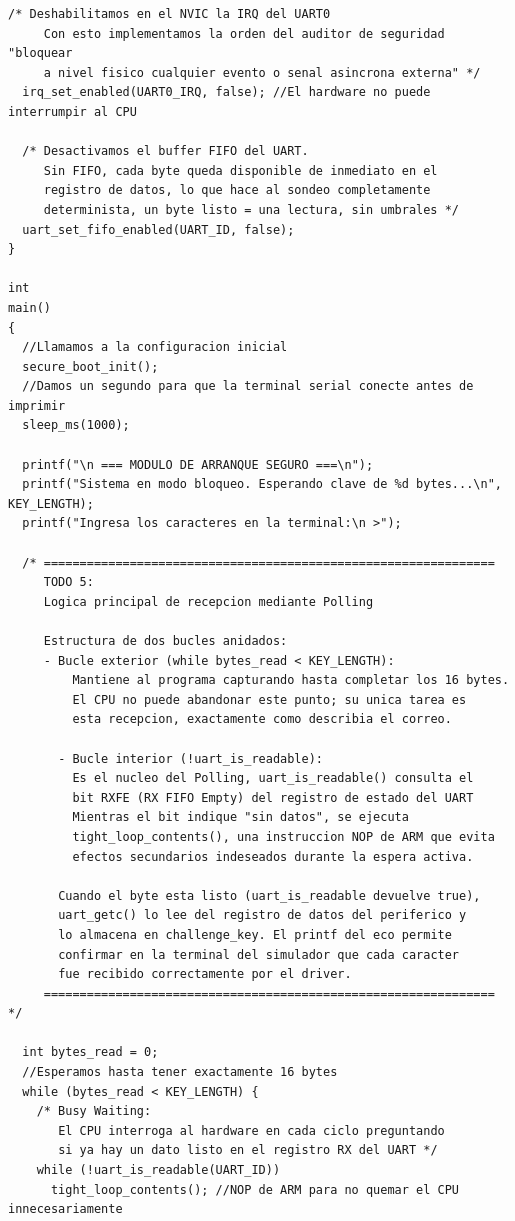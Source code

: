 \documentclass[12pt,letterpaper]{article}
\begin{document}
\begin{lstlisting}[style=modernc, caption={main.c: driver de arranque seguro implementado con Polling}]
  /* Deshabilitamos en el NVIC la IRQ del UART0
     Con esto implementamos la orden del auditor de seguridad "bloquear
     a nivel fisico cualquier evento o senal asincrona externa" */
  irq_set_enabled(UART0_IRQ, false); //El hardware no puede interrumpir al CPU

  /* Desactivamos el buffer FIFO del UART.
     Sin FIFO, cada byte queda disponible de inmediato en el
     registro de datos, lo que hace al sondeo completamente
     determinista, un byte listo = una lectura, sin umbrales */
  uart_set_fifo_enabled(UART_ID, false);
}

int
main()
{
  //Llamamos a la configuracion inicial
  secure_boot_init();
  //Damos un segundo para que la terminal serial conecte antes de imprimir
  sleep_ms(1000);
  
  printf("\n === MODULO DE ARRANQUE SEGURO ===\n");
  printf("Sistema en modo bloqueo. Esperando clave de %d bytes...\n", KEY_LENGTH);
  printf("Ingresa los caracteres en la terminal:\n >");
  
  /* ===============================================================
     TODO 5:
     Logica principal de recepcion mediante Polling

     Estructura de dos bucles anidados:
     - Bucle exterior (while bytes_read < KEY_LENGTH):
         Mantiene al programa capturando hasta completar los 16 bytes.
         El CPU no puede abandonar este punto; su unica tarea es
         esta recepcion, exactamente como describia el correo.

       - Bucle interior (!uart_is_readable):
         Es el nucleo del Polling, uart_is_readable() consulta el
         bit RXFE (RX FIFO Empty) del registro de estado del UART
         Mientras el bit indique "sin datos", se ejecuta
         tight_loop_contents(), una instruccion NOP de ARM que evita
         efectos secundarios indeseados durante la espera activa.

       Cuando el byte esta listo (uart_is_readable devuelve true),
       uart_getc() lo lee del registro de datos del periferico y
       lo almacena en challenge_key. El printf del eco permite
       confirmar en la terminal del simulador que cada caracter
       fue recibido correctamente por el driver.
     =============================================================== */
  
  int bytes_read = 0;
  //Esperamos hasta tener exactamente 16 bytes
  while (bytes_read < KEY_LENGTH) {
    /* Busy Waiting:
       El CPU interroga al hardware en cada ciclo preguntando
       si ya hay un dato listo en el registro RX del UART */
    while (!uart_is_readable(UART_ID))
      tight_loop_contents(); //NOP de ARM para no quemar el CPU innecesariamente
    

\end{lstlisting}
\end{document}
